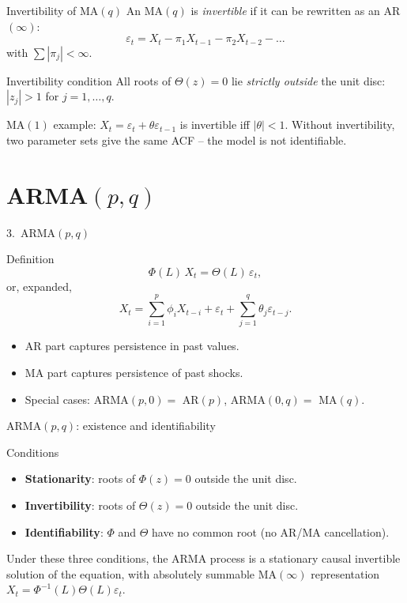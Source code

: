 \documentclass[aspectratio=169]{beamer}
\begin{document}
\begin{frame}{Invertibility of MA$(q)$}
  An MA$(q)$ is \emph{invertible} if it can be rewritten as an
  AR$(\infty)$:
  \[
    \varepsilon_t = X_t - \pi_1 X_{t-1} - \pi_2 X_{t-2} - \dots
  \]
  with $\sum |\pi_j| < \infty$.
  \begin{block}{Invertibility condition}
    All roots of $\Theta(z) = 0$ lie \emph{strictly outside} the unit
    disc: $|z_j| > 1$ for $j = 1, \dots, q$.
  \end{block}
  \pause
  MA$(1)$ example: $X_t = \varepsilon_t + \theta \varepsilon_{t-1}$
  is invertible iff $|\theta| < 1$. Without invertibility, two
  parameter sets give the same ACF -- the model is not identifiable.
\end{frame}

\section{ARMA$(p,q)$}

\begin{frame}{3.~ARMA$(p,q)$}
  \begin{block}{Definition}
    \[
      \Phi(L)\, X_t = \Theta(L)\, \varepsilon_t,
    \]
    or, expanded,
    \[
      X_t = \sum_{i=1}^{p} \phi_i X_{t-i}
          + \varepsilon_t + \sum_{j=1}^{q} \theta_j \varepsilon_{t-j}.
    \]
  \end{block}
  \pause
  \begin{itemize}
    \item AR part captures persistence in past values.
    \item MA part captures persistence of past shocks.
    \item Special cases: ARMA$(p, 0) = $ AR$(p)$,
          ARMA$(0, q) = $ MA$(q)$.
  \end{itemize}
\end{frame}

\begin{frame}{ARMA$(p,q)$: existence and identifiability}
  \begin{block}{Conditions}
    \begin{itemize}
      \item \textbf{Stationarity}: roots of $\Phi(z) = 0$ outside the
            unit disc.
      \item \textbf{Invertibility}: roots of $\Theta(z) = 0$ outside
            the unit disc.
      \item \textbf{Identifiability}: $\Phi$ and $\Theta$ have no common
            root (no AR/MA cancellation).
    \end{itemize}
  \end{block}
  \pause
  Under these three conditions, the ARMA process is a stationary
  causal invertible solution of the equation, with absolutely
  summable MA$(\infty)$ representation $X_t = \Phi^{-1}(L)\Theta(L)
  \varepsilon_t$.
\end{frame}
\end{document}
